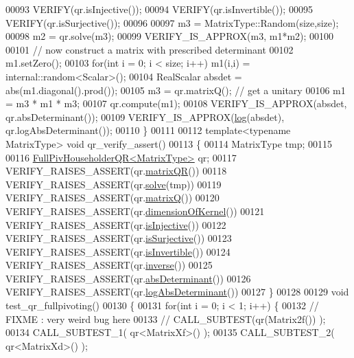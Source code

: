 \begin{DoxyCode}
00093   VERIFY(qr.isInjective());
00094   VERIFY(qr.isInvertible());
00095   VERIFY(qr.isSurjective());
00096 
00097   m3 = MatrixType::Random(size,size);
00098   m2 = qr.solve(m3);
00099   VERIFY\_IS\_APPROX(m3, m1*m2);
00100 
00101   \textcolor{comment}{// now construct a matrix with prescribed determinant}
00102   m1.setZero();
00103   \textcolor{keywordflow}{for}(\textcolor{keywordtype}{int} i = 0; i < size; i++) m1(i,i) = internal::random<Scalar>();
00104   RealScalar absdet = abs(m1.diagonal().prod());
00105   m3 = qr.matrixQ(); \textcolor{comment}{// get a unitary}
00106   m1 = m3 * m1 * m3;
00107   qr.compute(m1);
00108   VERIFY\_IS\_APPROX(absdet, qr.absDeterminant());
00109   VERIFY\_IS\_APPROX(\hyperlink{structlog}{log}(absdet), qr.logAbsDeterminant());
00110 \}
00111 
00112 \textcolor{keyword}{template}<\textcolor{keyword}{typename} MatrixType> \textcolor{keywordtype}{void} qr\_verify\_assert()
00113 \{
00114   MatrixType tmp;
00115 
00116   \hyperlink{group___q_r___module}{FullPivHouseholderQR<MatrixType>} qr;
00117   VERIFY\_RAISES\_ASSERT(qr.\hyperlink{group___q_r___module_a9c16411e5d8f1fc634a5797018d5aa3e}{matrixQR}())
00118   VERIFY\_RAISES\_ASSERT(qr.\hyperlink{group___q_r___module_a6f1b0a116c78e642e3d2a100a29d1a4a}{solve}(tmp))
00119   VERIFY\_RAISES\_ASSERT(qr.\hyperlink{group___q_r___module_ad26dd2d3c002939771d2375e4e051c28}{matrixQ}())
00120   VERIFY\_RAISES\_ASSERT(qr.\hyperlink{group___q_r___module_a3b5fe5edc66acc01c45b16e728470aa0}{dimensionOfKernel}())
00121   VERIFY\_RAISES\_ASSERT(qr.\hyperlink{group___q_r___module_a6776788011026b0f63192485a59deaed}{isInjective}())
00122   VERIFY\_RAISES\_ASSERT(qr.\hyperlink{group___q_r___module_aa3593db4708ce9079b0bdf219b99f57e}{isSurjective}())
00123   VERIFY\_RAISES\_ASSERT(qr.\hyperlink{group___q_r___module_aeb1d779ec22ec68a5a28d4235db02ec1}{isInvertible}())
00124   VERIFY\_RAISES\_ASSERT(qr.\hyperlink{group___q_r___module_a352ce66397af06da214ddde343cec6f5}{inverse}())
00125   VERIFY\_RAISES\_ASSERT(qr.\hyperlink{group___q_r___module_a1029e1ccc70bb8669043c5775e7f3b75}{absDeterminant}())
00126   VERIFY\_RAISES\_ASSERT(qr.\hyperlink{group___q_r___module_aafde38918912c9b562f44b0fc3b22589}{logAbsDeterminant}())
00127 \}
00128 
00129 \textcolor{keywordtype}{void} test\_qr\_fullpivoting()
00130 \{
00131  \textcolor{keywordflow}{for}(\textcolor{keywordtype}{int} i = 0; i < 1; i++) \{
00132     \textcolor{comment}{// FIXME : very weird bug here}
00133 \textcolor{comment}{//     CALL\_SUBTEST(qr(Matrix2f()) );}
00134     CALL\_SUBTEST\_1( qr<MatrixXf>() );
00135     CALL\_SUBTEST\_2( qr<MatrixXd>() );

\end{DoxyCode}
